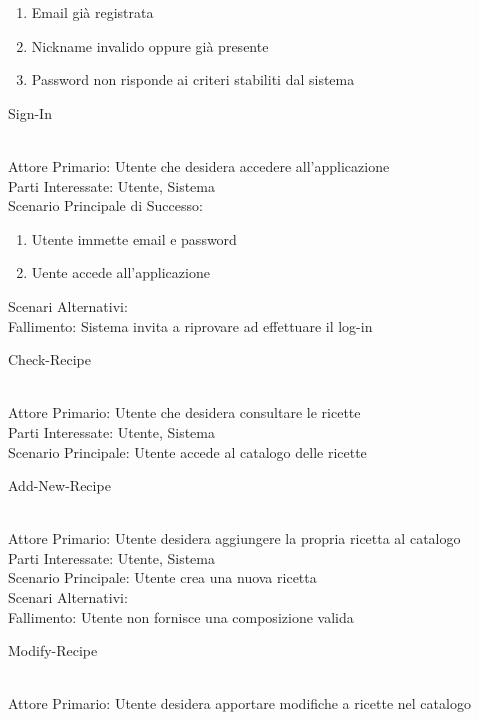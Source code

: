\documentclass[12pt]{article}
\begin{document}
\begin{enumerate}
\item Email già registrata
\item Nickname invalido oppure già presente
\item Password non risponde ai criteri stabiliti dal sistema
\end{enumerate}
\bigskip
\begin{itshape}
Sign-In
\end{itshape}\\
Attore Primario: Utente che desidera accedere all'applicazione\\
Parti Interessate: Utente, Sistema\\
Scenario Principale di Successo:\\
\begin{enumerate}
\item Utente immette email e password
\item Uente accede all'applicazione
\end{enumerate}
Scenari Alternativi:\\
Fallimento: Sistema invita a riprovare ad effettuare il log-in
\bigskip
\\
\begin{itshape}
Check-Recipe
\end{itshape}\\
Attore Primario: Utente che desidera consultare le ricette\\
Parti Interessate: Utente, Sistema\\
Scenario Principale: Utente accede al catalogo delle ricette
\bigskip
\\
\begin{itshape}
Add-New-Recipe
\end{itshape}\\
Attore Primario: Utente desidera aggiungere la propria ricetta al catalogo\\
Parti Interessate: Utente, Sistema\\
Scenario Principale: Utente crea una nuova ricetta\\
Scenari Alternativi:\\
Fallimento: Utente non fornisce una composizione valida
\bigskip
\\
\begin{itshape}
Modify-Recipe
\end{itshape}\\
Attore Primario: Utente desidera apportare modifiche a ricette nel catalogo\\
\end{document}

